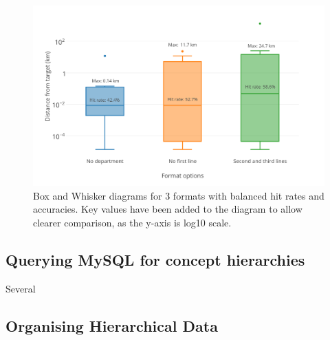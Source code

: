 \documentclass[Report.tex]{subfiles}
\begin{document}
\begin{figure}[h!]
	\includegraphics[width=\textwidth]{../lib/images/distance-boxes}
	\caption{Box and Whisker diagrams for 3 formats with balanced hit rates and accuracies. Key values have been added to the diagram to allow clearer comparison, as the y-axis is log10 scale.\label{fig:geoboxes}}
\end{figure}

\subsection{Querying MySQL for concept hierarchies}
Several 

\subsection{Organising Hierarchical Data}
\end{document}
